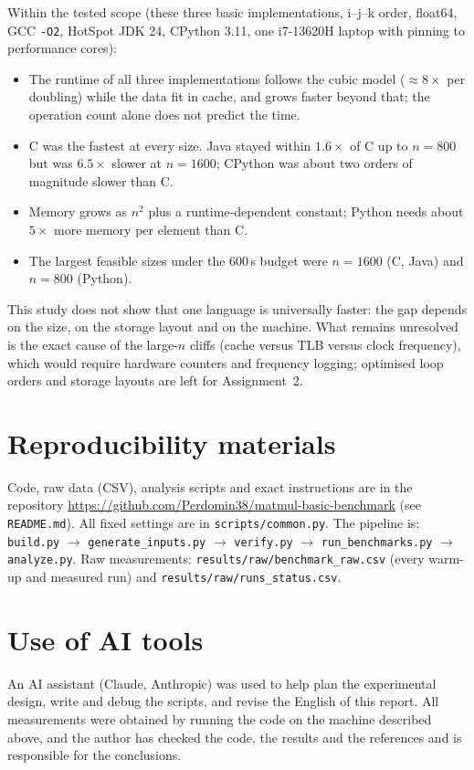 \documentclass[11pt,a4paper]{article}
\begin{document}
Within the tested scope (these three basic implementations, i--j--k order, float64,
GCC \texttt{-O2}, HotSpot JDK 24, CPython 3.11, one i7-13620H laptop with pinning to
performance cores):
\begin{itemize}
  \item The runtime of all three implementations follows the cubic model ($\approx 8\times$
        per doubling) while the data fit in cache, and grows faster beyond that;
        the operation count alone does not predict the time.
  \item C was the fastest at every size. Java stayed within $1.6\times$ of C up to
        $n = 800$ but was $6.5\times$ slower at $n = 1600$; CPython was about two orders
        of magnitude slower than C.
  \item Memory grows as $n^2$ plus a runtime-dependent constant; Python needs about
        $5\times$ more memory per element than C.
  \item The largest feasible sizes under the 600\,s budget were $n = 1600$ (C, Java) and
        $n = 800$ (Python).
\end{itemize}
This study does not show that one language is universally faster: the gap depends on the
size, on the storage layout and on the machine. What remains unresolved is the exact cause
of the large-$n$ cliffs (cache versus TLB versus clock frequency), which would require
hardware counters and frequency logging; optimised loop orders and storage layouts are
left for Assignment~2.

\section*{Reproducibility materials}
Code, raw data (CSV), analysis scripts and exact instructions are in the repository
\url{https://github.com/Perdomin38/matmul-basic-benchmark} (see \texttt{README.md}).
All fixed settings are in \texttt{scripts/common.py}. The pipeline is:
\texttt{build.py} $\rightarrow$ \texttt{generate\_inputs.py} $\rightarrow$
\texttt{verify.py} $\rightarrow$ \texttt{run\_benchmarks.py} $\rightarrow$
\texttt{analyze.py}. Raw measurements: \texttt{results/raw/benchmark\_raw.csv} (every
warm-up and measured run) and \texttt{results/raw/runs\_status.csv}.

\section*{Use of AI tools}
An AI assistant (Claude, Anthropic) was used to help plan the experimental design, write
and debug the scripts, and revise the English of this report. All measurements were
obtained by running the code on the machine described above, and the author has checked
the code, the results and the references and is responsible for the conclusions.
\end{document}
